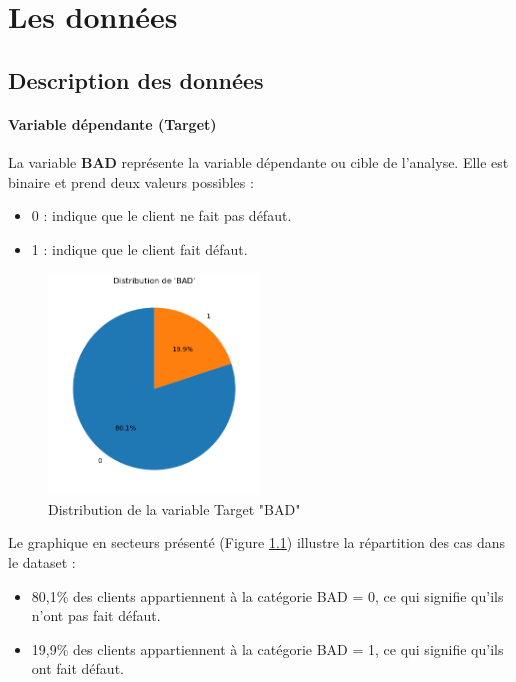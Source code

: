 \documentclass[a4paper,12pt]{report}
\begin{document}
\chapter{Les données}
\section{Description des données}

\subsubsection{Variable dépendante (Target)}

La variable \textbf{BAD} représente la variable dépendante ou cible de l'analyse.
Elle est binaire et prend deux valeurs possibles :

\begin{itemize}
  \item 0 : indique que le client ne fait pas défaut.
  \item 1 : indique que le client fait défaut.
\end{itemize}

\bigbreak

\begin{figure}[h!]
  \begin{center}
    \includegraphics[width=0.5\textwidth]{../images/target_distribution}
  \end{center}
  \caption{Distribution de la variable Target "BAD"}
  \label{fig:dis_target}
\end{figure}


Le graphique en secteurs présenté (Figure \ref{fig:dis_target}) illustre la répartition des cas dans le dataset :
\begin{itemize}
  \item 80,1\% des clients appartiennent à la catégorie BAD = 0, ce qui signifie qu'ils n'ont pas fait défaut.
  \item 19,9\% des clients appartiennent à la catégorie BAD = 1, ce qui signifie qu'ils ont fait défaut.
\end{itemize}
\ \\
\end{document}
